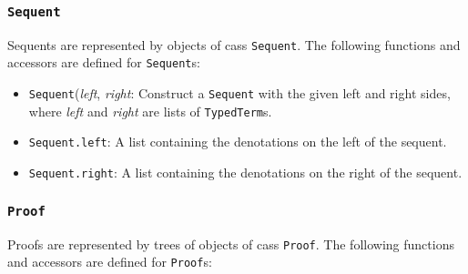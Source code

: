 \documentclass[11pt]{article}
\begin{document}
\subsubsection{\texttt{Sequent}}

Sequents are represented by objects of cass \texttt{Sequent}.  The
following functions and accessors are defined for \texttt{Sequent}s:

\begin{itemize}
  \item \texttt{Sequent}(\textit{left}, \textit{right}: Construct a
  \texttt{Sequent} with the given left and right sides, where
  \textit{left} and \textit{right} are lists of \texttt{TypedTerm}s.
  \item \texttt{Sequent.left}: A list containing the denotations on
  the left of the sequent.
  \item \texttt{Sequent.right}: A list containing the denotations on
  the right of the sequent.
\end{itemize}

\subsubsection{\texttt{Proof}}

Proofs are represented by trees of objects of cass \texttt{Proof}.
The following functions and accessors are defined for
\texttt{Proof}s:
\end{document}
